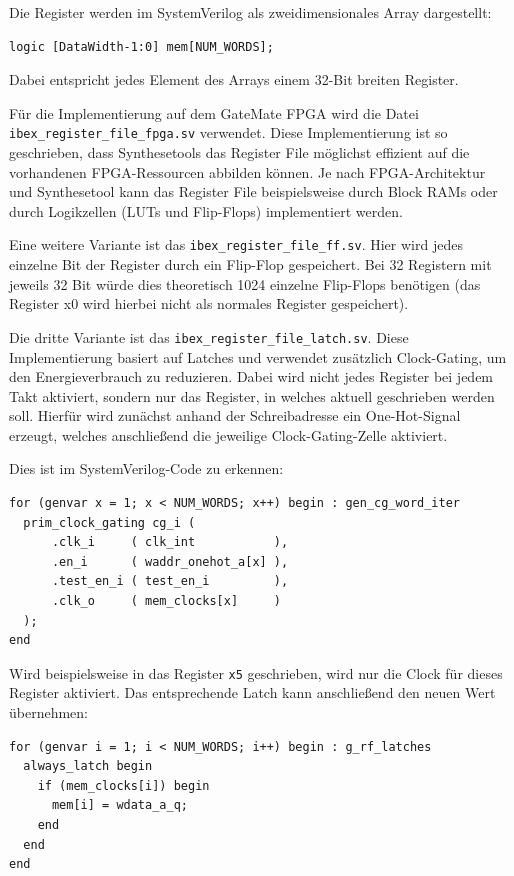 \documentclass[a4paper,11pt]{article}
\begin{document}
Die Register werden im SystemVerilog als zweidimensionales Array dargestellt:

\begin{verbatim}
logic [DataWidth-1:0] mem[NUM_WORDS];
\end{verbatim}

Dabei entspricht jedes Element des Arrays einem 32-Bit breiten Register.

Für die Implementierung auf dem GateMate FPGA wird die Datei
\texttt{ibex\_register\_file\_fpga.sv} verwendet. Diese Implementierung ist so geschrieben, dass Synthesetools das Register File möglichst effizient auf die vorhandenen FPGA-Ressourcen abbilden können. Je nach FPGA-Architektur und Synthesetool kann das Register File beispielsweise durch Block RAMs oder durch Logikzellen (LUTs und Flip-Flops) implementiert werden.

Eine weitere Variante ist das \texttt{ibex\_register\_file\_ff.sv}.
Hier wird jedes einzelne Bit der Register durch ein Flip-Flop gespeichert.
Bei 32 Registern mit jeweils 32 Bit würde dies theoretisch 1024 einzelne Flip-Flops benötigen (das Register x0 wird hierbei nicht als normales Register gespeichert).

Die dritte Variante ist das \texttt{ibex\_register\_file\_latch.sv}.
Diese Implementierung basiert auf Latches und verwendet zusätzlich Clock-Gating, um den Energieverbrauch zu reduzieren.
Dabei wird nicht jedes Register bei jedem Takt aktiviert, sondern nur das Register, in welches aktuell geschrieben werden soll.
Hierfür wird zunächst anhand der Schreibadresse ein One-Hot-Signal erzeugt, welches anschließend die jeweilige Clock-Gating-Zelle aktiviert.

Dies ist im SystemVerilog-Code zu erkennen:

\begin{verbatim}
for (genvar x = 1; x < NUM_WORDS; x++) begin : gen_cg_word_iter
  prim_clock_gating cg_i (
      .clk_i     ( clk_int           ),
      .en_i      ( waddr_onehot_a[x] ),
      .test_en_i ( test_en_i         ),
      .clk_o     ( mem_clocks[x]     )
  );
end
\end{verbatim}

Wird beispielsweise in das Register \texttt{x5} geschrieben, wird nur die Clock für dieses Register aktiviert.
Das entsprechende Latch kann anschließend den neuen Wert übernehmen:

\begin{verbatim}
for (genvar i = 1; i < NUM_WORDS; i++) begin : g_rf_latches
  always_latch begin
    if (mem_clocks[i]) begin
      mem[i] = wdata_a_q;
    end
  end
end
\end{verbatim}
\end{document}
